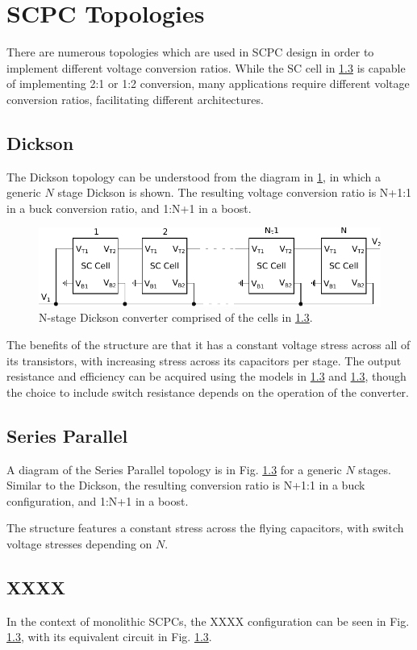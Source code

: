 	
	\section{SCPC Topologies}
	There are numerous topologies which are used in SCPC design in order to implement different voltage conversion ratios. While the SC cell in \ref{} is capable of implementing 2:1 or 1:2 conversion, many applications require different voltage conversion ratios, facilitating different architectures.
	\subsection{Dickson}
	The Dickson topology can be understood from the diagram in \ref{fig:NDickson}, in which a generic $N$ stage Dickson is shown. The resulting voltage conversion ratio is N+1:1 in a buck conversion ratio, and 1:N+1 in a boost.
	
	\begin{figure}
		\includegraphics[width=\linewidth]{4Terminal/Figures/NDickson.pdf}
		\caption{N-stage Dickson converter comprised of the cells in \ref{}.}
		\label{fig:NDickson}
	\end{figure}
	
	The benefits of the structure are that it has a constant voltage stress across all of its transistors, with increasing stress across its capacitors per stage. The output resistance and efficiency can be acquired using the models in \ref{} and \ref{}, though the choice to include switch resistance depends on the operation of the converter.
	\subsection{Series Parallel}
	A diagram of the Series Parallel topology is in Fig. \ref{} for a generic $N$ stages. Similar to the Dickson, the resulting conversion ratio is N+1:1 in a buck configuration, and 1:N+1 in a boost.
	
	The structure features a constant stress across the flying capacitors, with switch voltage stresses depending on $N$.
	\subsection{XXXX}
	In the context of monolithic SCPCs, the XXXX configuration can be seen in Fig. \ref{}, with its equivalent circuit in Fig. \ref{}.
	
